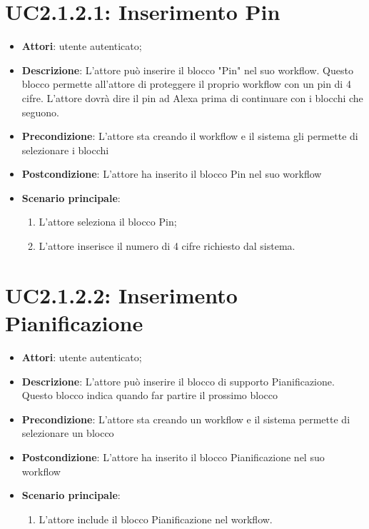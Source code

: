 \section{UC2.1.2.1: Inserimento Pin}
\label{UC2.1.2.1}
\begin{itemize}
	\item \textbf{Attori}: utente autenticato;
	\item \textbf{Descrizione}: L'attore può inserire il blocco "Pin" nel suo workflow. Questo blocco permette all'attore di proteggere il proprio workflow con un pin di 4 cifre. L'attore dovrà dire il pin ad Alexa prima di continuare con i blocchi che seguono.
	\item \textbf{Precondizione}: L'attore sta creando il workflow e il sistema gli permette di selezionare i blocchi
	\item \textbf{Postcondizione}: L'attore ha inserito il blocco Pin nel suo workflow
	\item \textbf{Scenario principale}:
	\begin{enumerate} \item L'attore seleziona il blocco Pin;  \item 
		L'attore inserisce il numero di 4 cifre richiesto dal sistema.\end{enumerate}
\end{itemize}

\section{UC2.1.2.2: Inserimento Pianificazione}
\label{UC2.1.2.2}
\begin{itemize}
	\item \textbf{Attori}: utente autenticato;
	\item \textbf{Descrizione}: L'attore può inserire il blocco di supporto Pianificazione. Questo blocco indica quando far partire il prossimo blocco
	\item \textbf{Precondizione}: L'attore sta creando un workflow e il sistema permette di selezionare un blocco
	\item \textbf{Postcondizione}: L'attore ha inserito il blocco Pianificazione nel suo workflow
	\item \textbf{Scenario principale}:
	\begin{enumerate} \item L'attore include il blocco Pianificazione nel workflow.\end{enumerate}
\end{itemize}

